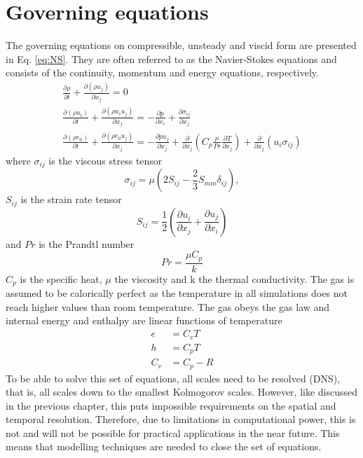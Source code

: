 \section{Governing equations}
The governing equations on compressible, unsteady and viscid form are presented in Eq. \ref{eq:NS}. They are often referred to as the Navier-Stokes equations and consists of the continuity, momentum and energy equations, respectively.
\begin{equation} 
  \label{eq:NS}
  \begin{gathered}
    \frac{\partial {\rho}}{\partial t} + \frac{\partial \left({\rho} {u}_j \right)}{\partial x_j} = 0 \\
    \frac{\partial \left( {\rho} {u}_i \right)}{\partial t} + \frac{\partial\left({\rho} {u}_i {u}_j \right)}{\partial x_j} = -\frac{\partial p}{\partial x_i} + \frac{\partial {\sigma} _{ij}}{\partial x_j} \\
    \frac{\partial \left( {\rho} {e}_0\right)}{\partial t} + \frac{\partial \left({\rho} {e}_0 {u}_j\right)}{\partial x_j}= -\frac{\partial {p}{u}_j}{\partial x_j}+\frac{\partial}{\partial x_j}\left(C_p\frac{\mu}{Pr}\frac{\partial {T}}{\partial x_j}\right)+\frac{\partial}{\partial x_j}\left({u}_i\sigma_{ij}\right)
  \end{gathered}
\end{equation}
where ${\sigma} _{ij}$ is the viscous stress tensor
\begin{equation}
  {\sigma} _{ij} = \mu \left(2{S}_{ij}-\frac{2}{3}{S}_{mm}\delta _{ij}\right),
\end{equation}
${S}_{ij}$ is the strain rate tensor
\begin{equation}
  {S}_{ij}=\frac{1}{2}\left(\frac{\partial {u}_i}{\partial x_j}+\frac{\partial {u}_j}{\partial x_i}\right)
\end{equation}
and $Pr$ is the Prandtl number
\begin{equation}
  Pr = \frac{\mu C_p}{k}
\end{equation}
$C_p$ is the specific heat, $\mu$ the viscosity and k the thermal conductivity. The gas is assumed to be calorically perfect as the temperature in all simulations does not reach higher values than room temperature. The gas obeys the gas law and internal energy and enthalpy are linear functions of temperature
\begin{equation}
  \begin{aligned}
    e &= C_vT \\
    h &= C_pT \\
    C_v &= C_p-R
\end{aligned}
\end{equation}
To be able to solve this set of equations, all scales need to be resolved (DNS), that is, all scales down to the smallest Kolmogorov scales. However, like discussed in the previous chapter, this puts impossible requirements on the spatial and temporal resolution. Therefore, due to limitations in computational power, this is not and will not be possible for practical applications in the near future. This means that modelling techniques are needed to close the set of equations. 

